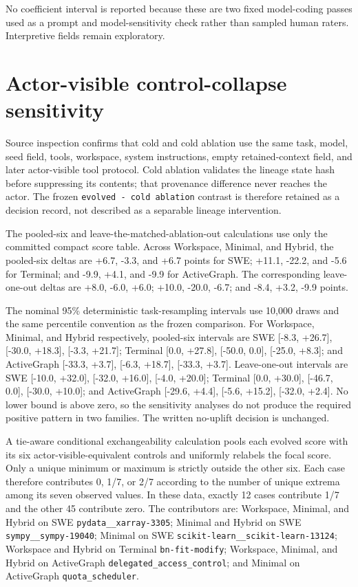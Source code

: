 \documentclass[10pt,twocolumn]{article}
\begin{document}
No coefficient interval is reported because these are two fixed
model-coding passes used as a prompt and model-sensitivity check rather
than sampled human raters. Interpretive fields remain exploratory.

\section{Actor-visible control-collapse sensitivity}\label{f.-actor-visible-control-collapse-sensitivity}

Source inspection confirms that cold and cold ablation use the same
task, model, seed field, tools, workspace, system instructions, empty
retained-context field, and later actor-visible tool protocol. Cold
ablation validates the lineage state hash before suppressing its
contents; that provenance difference never reaches the actor. The frozen
\texttt{evolved\ -\ cold\ ablation} contrast is therefore retained as a
decision record, not described as a separable lineage intervention.

The pooled-six and leave-the-matched-ablation-out calculations use only
the committed compact score table. Across Workspace, Minimal, and
Hybrid, the pooled-six deltas are +6.7, -3.3, and +6.7 points for SWE;
+11.1, -22.2, and -5.6 for Terminal; and -9.9, +4.1, and -9.9 for
ActiveGraph. The corresponding leave-one-out deltas are +8.0, -6.0,
+6.0; +10.0, -20.0, -6.7; and -8.4, +3.2, -9.9 points.

The nominal 95\% deterministic task-resampling intervals use 10,000
draws and the same percentile convention as the frozen comparison. For
Workspace, Minimal, and Hybrid respectively, pooled-six intervals are
SWE {[}-8.3, +26.7{]}, {[}-30.0, +18.3{]}, {[}-3.3, +21.7{]}; Terminal
{[}0.0, +27.8{]}, {[}-50.0, 0.0{]}, {[}-25.0, +8.3{]}; and ActiveGraph
{[}-33.3, +3.7{]}, {[}-6.3, +18.7{]}, {[}-33.3, +3.7{]}. Leave-one-out
intervals are SWE {[}-10.0, +32.0{]}, {[}-32.0, +16.0{]}, {[}-4.0,
+20.0{]}; Terminal {[}0.0, +30.0{]}, {[}-46.7, 0.0{]}, {[}-30.0,
+10.0{]}; and ActiveGraph {[}-29.6, +4.4{]}, {[}-5.6, +15.2{]},
{[}-32.0, +2.4{]}. No lower bound is above zero, so the sensitivity
analyses do not produce the required positive pattern in two families.
The written no-uplift decision is unchanged.

A tie-aware conditional exchangeability calculation pools each evolved
score with its six actor-visible-equivalent controls and uniformly
relabels the focal score. Only a unique minimum or maximum is strictly
outside the other six. Each case therefore contributes 0, 1/7, or 2/7
according to the number of unique extrema among its seven observed
values. In these data, exactly 12 cases contribute 1/7 and the other 45
contribute zero. The contributors are: Workspace, Minimal, and Hybrid on
SWE \texttt{pydata\_\_xarray-3305}; Minimal and Hybrid on SWE
\texttt{sympy\_\_sympy-19040}; Minimal on SWE
\texttt{scikit-learn\_\_scikit-learn-13124}; Workspace and Hybrid on
Terminal \texttt{bn-fit-modify}; Workspace, Minimal, and Hybrid on
ActiveGraph \texttt{delegated\_access\_control}; and Minimal on
ActiveGraph \texttt{quota\_scheduler}.
\end{document}
